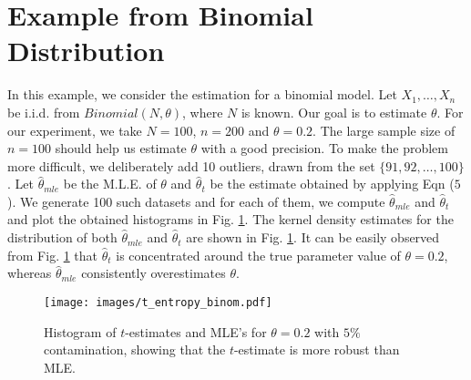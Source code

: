 \documentclass{article}
\begin{document}
\section{Example from Binomial Distribution}
In this example, we consider the estimation for a binomial model. Let $X_1,\dots,X_n$ be i.i.d. from $Binomial(N,\theta)$, where $N$ is known. Our goal is to estimate $\theta$. For our experiment, we take $N=100$, $n=200$ and $\theta=0.2$. The large sample size of $n=100$ should help us estimate $\theta$ with a good precision. To make the problem more difficult, we deliberately add 10 outliers, drawn from the set $\{91,92,\dots,100\}$. Let $\hat{\theta}_{mle}$ be the M.L.E. of $\theta$ and $\hat{\theta}_{t}$ be the estimate obtained by applying Eqn ($5$). We generate 100 such datasets and for each of them, we compute $\hat{\theta}_{mle}$ and $\hat{\theta}_{t}$ and plot the obtained histograms in Fig. \ref{fig:binom}. The kernel density estimates for the distribution of both $\hat{\theta}_{mle}$ and $\hat{\theta}_{t}$ are shown in Fig. \ref{fig:binom}. It can be easily observed from Fig. \ref{fig:binom} that $\hat{\theta}_t$ is concentrated around the true parameter value of $\theta=0.2$, whereas $\hat{\theta}_{mle}$ consistently overestimates $\theta$.
\begin{figure}[ht]
    \centering
    \texttt{[image: images/t\_entropy\_binom.pdf]}
    \caption{Histogram of $t$-estimates and MLE's for $\theta=0.2$ with $5\%$ contamination, showing that the $t$-estimate is more robust than MLE.}
    \label{fig:binom}
\end{figure}
\end{document}
